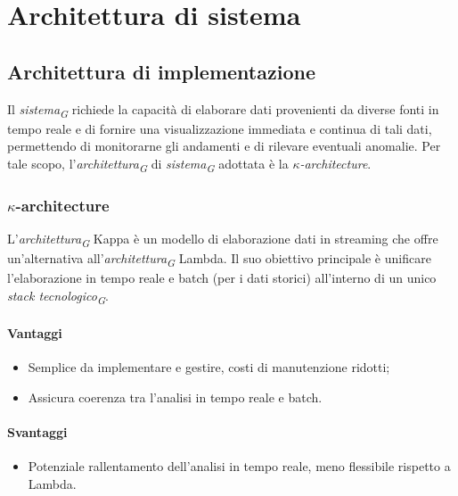 \section{Architettura di sistema}
\subsection{Architettura di implementazione}
Il \textit{sistema}\textsubscript{\textit{G}} richiede la capacità di elaborare dati provenienti da diverse fonti in tempo reale e di fornire una visualizzazione immediata e continua di tali dati, permettendo di monitorarne gli andamenti e di rilevare eventuali anomalie. 
Per tale scopo, l'\textit{architettura}\textsubscript{\textit{G}} di \textit{sistema}\textsubscript{\textit{G}} adottata è la \textit{$\kappa$-architecture}.

\subsubsection{$\kappa$-architecture}
L'\textit{architettura}\textsubscript{\textit{G}} Kappa è un modello di elaborazione dati in streaming che offre un'alternativa all'\textit{architettura}\textsubscript{\textit{G}} Lambda. Il suo obiettivo principale è unificare l'elaborazione in tempo reale e batch (per i dati storici) all'interno di un unico \textit{stack tecnologico}\textsubscript{\textit{G}}.
\paragraph{Vantaggi}
\begin{itemize}
    \item Semplice da implementare e gestire, costi di manutenzione ridotti;
    \item Assicura coerenza tra l'analisi in tempo reale e batch.
\end{itemize}
\paragraph*{Svantaggi}
\begin{itemize}
    \item Potenziale rallentamento dell'analisi in tempo reale, meno flessibile rispetto a Lambda.
\end{itemize}

